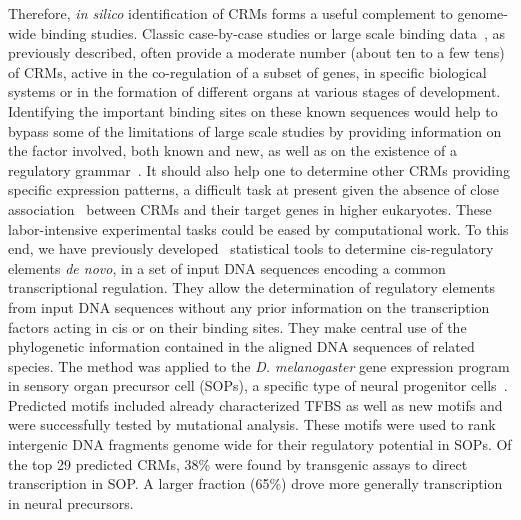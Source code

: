 \documentclass[a4,center,fleqn]{NAR}
\begin{document}
\enlargethispage{-65.1pt}

Therefore, {\em in silico} identification of CRMs  forms a useful complement to
genome-wide binding studies. 
Classic case-by-case studies or large scale binding data~\cite{Visel:2009fr},
as  previously described, often provide a moderate number (about ten to a few
tens) of CRMs, active  in the co-regulation of a subset of genes, in specific
biological systems or in the formation of different  organs at various stages
of development. 
Identifying the important binding sites on these known sequences would help to
bypass some of the limitations of large scale studies by providing information
on the factor involved, both known and new, as well as on the existence of
a regulatory grammar~\cite{arnosti}.
It should also help one to determine other CRMs providing specific expression
patterns, a difficult task at present given the absence of close
association~\cite{pmid19097946} between CRMs and their target genes in higher
eukaryotes.
These labor-intensive experimental tasks could be eased by computational work.
To this end,  we have previously developed~\cite{Rouault:2010fk} statistical
tools to determine cis-regulatory elements \textit{de novo}, in a set of input
DNA sequences encoding a common transcriptional regulation.
They allow the determination of regulatory elements from input DNA sequences
without any  prior information on the transcription factors acting in cis or on
their binding sites. 
They make  central use of  the phylogenetic information
contained in the aligned DNA sequences of related species.
The method was applied to the {\em D. melanogaster} gene expression program in
sensory organ precursor cell (SOPs), a specific type of neural progenitor
cells~\cite{Rouault:2010fk}.
Predicted motifs  included already characterized TFBS as well as new motifs and
were successfully tested by mutational analysis.
These motifs were used to rank intergenic DNA fragments genome wide for their
regulatory potential in SOPs.
Of the top 29 predicted CRMs, 38\% were found by transgenic assays to direct
transcription in SOP. A larger fraction (65\%) drove more generally
transcription in neural precursors.
 
\end{document}
